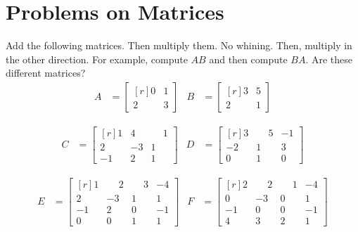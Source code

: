 
\section{Problems on Matrices}
    \begin{problem}
        Add the following matrices. Then multiply them. No whining.
        Then, multiply in the other direction. For example, compute
        $AB$ and then compute $BA$. Are these different matrices?
        \begin{align*}
            A&=
            \begin{bmatrix*}[r]
                0&1\\
                2&3
            \end{bmatrix*}
            &
            B&=
            \begin{bmatrix*}[r]
                3&5\\
                2&1
            \end{bmatrix*}
        \end{align*}
        \par\hfill\par
        \begin{align*}
            C&=
            \begin{bmatrix*}[r]
                1&4&\phantom{\minus}1\\
                2&\minus{3}&1\\
                \minus{1}&2&1
            \end{bmatrix*}
            &
            D&=
            \begin{bmatrix*}[r]
                3&\phantom{\minus}5&\minus{1}\\
                \minus{2}&1&3\\
                0&1&0
            \end{bmatrix*}
        \end{align*}
        \par\hfill\par
        \begin{align*}
            E&=
            \begin{bmatrix*}[r]
                1&\phantom{\minus}2&\phantom{\minus}3&\minus{4}\\
                2&\minus{3}&1&1\\
                \minus{1}&2&0&\minus{1}\\
                0&0&1&1
            \end{bmatrix*}
            &
            F&=
            \begin{bmatrix*}[r]
                2&\phantom{\minus}2&\phantom{\minus}1&\minus{4}\\
                0&\minus{3}&0&1\\
                \minus{1}&0&0&\minus{1}\\
                4&3&2&1
            \end{bmatrix*}
        \end{align*}
    \end{problem}

